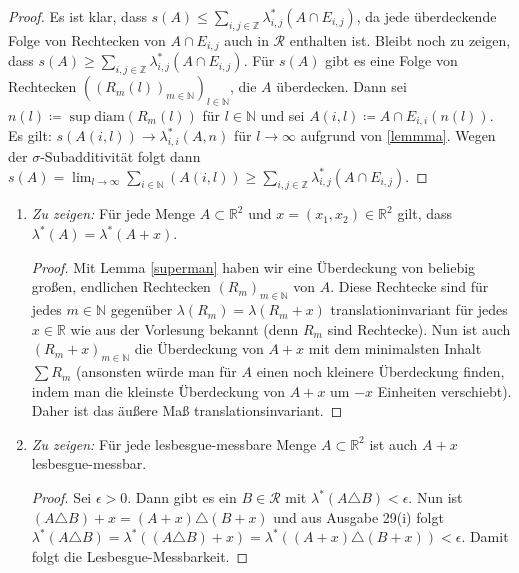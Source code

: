 \documentclass[a4paper,DIV=1]{article}
\theoremstyle{plain}
\begin{document}
\begin{proof}
	Es ist klar, dass $s(A) \leq  \sum_{i,j \in \mathbb Z}\lambda^*_{i,j}(A \cap E_{i,j})$, da jede überdeckende Folge von Rechtecken von $A \cap E_{i,j}$ auch in $\mathcal R$ enthalten ist. Bleibt noch zu zeigen, dass $s(A) \geq  \sum_{i,j \in \mathbb Z}\lambda^*_{i,j}(A \cap E_{i,j})$. Für $s(A)$ gibt es eine Folge von Rechtecken $((R_m(l))_{m \in \mathbb N})_{l \in \mathbb N}$, die $A$ überdecken. Dann sei $n(l) \coloneqq \sup\mathrm{diam}(R_m(l))$ für $l \in \mathbb N$ und sei $A(i,l) \coloneqq A \cap E_{i,i}(n(l))$. Es gilt: $s(A(i,l)) \to \lambda^*_{i,i}(A,n)$ für $l \to \infty$ aufgrund von \eqref{lemmma}. Wegen der $\sigma$-Subadditivität folgt dann $s(A) = \lim_{l \to \infty}\sum_{i \in \mathbb N}(A(i,l)) \geq \sum_{i,j \in \mathbb Z}\lambda^*_{i,j}(A \cap E_{i,j})$.
\end{proof}

\begin{enumerate}[label=(\roman*)]
	\item \textit{Zu zeigen:} Für jede Menge $A \subset \mathbb R^2$ und $x = (x_1,x_2) \in \mathbb R^2$ gilt, dass $\lambda^*(A) = \lambda^*(A+x)$.
	\begin{proof}
		Mit Lemma \ref{superman} haben wir eine Überdeckung von beliebig großen, endlichen Rechtecken $(R_m)_{m \in \mathbb N}$ von $A$. Diese Rechtecke sind für jedes $m \in \mathbb N$ gegenüber $\lambda(R_m) = \lambda(R_m+x)$ translationinvariant für jedes $x \in \mathbb R$ wie aus der Vorlesung bekannt (denn $R_m$ sind Rechtecke). Nun ist auch $(R_m+x)_{m \in \mathbb N}$ die Überdeckung von $A+x$ mit dem minimalsten Inhalt $\sum R_m$ (ansonsten würde man für $A$ einen noch kleinere Überdeckung finden, indem man die kleinste Überdeckung von $A+x$ um $-x$ Einheiten verschiebt). Daher ist das äußere Maß translationsinvariant.
	\end{proof}

	\item \textit{Zu zeigen:} Für jede lesbesgue-messbare Menge $A \subset \mathbb R^2$ ist auch $A+x$ lesbesgue-messbar. 
	\begin{proof}
		Sei $\epsilon > 0$. Dann gibt es ein $B \in \mathcal R$ mit $\lambda^*(A \triangle B) < \epsilon$. Nun ist $(A \triangle B)+x = (A+x) \triangle (B+x)$ und aus Ausgabe 29(i) folgt $\lambda^*(A \triangle B) = \lambda^*((A\triangle B)+x) = \lambda^*((A+x) \triangle (B+x)) < \epsilon$. Damit folgt die Lesbesgue-Messbarkeit.
	\end{proof}
\end{enumerate}
\end{document}
